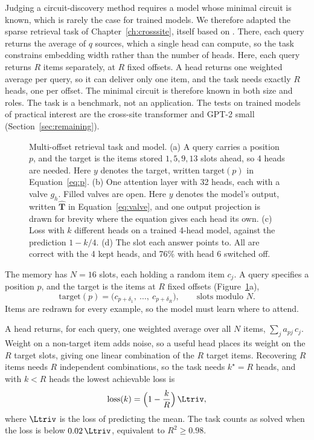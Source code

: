 Judging a circuit-discovery method requires a model whose minimal circuit is known, which is rarely the case for trained models. We therefore adapted the sparse retrieval task of Chapter~\ref{ch:crosssite}, itself based on \citet{sanford2023representational}. There, each query returns the average of $q$ sources, which a single head can compute, so the task constrains embedding width rather than the number of heads. Here, each query returns $R$ items separately, at $R$ fixed offsets. A head returns one weighted average per query, so it can deliver only one item, and the task needs exactly $R$ heads, one per offset. The minimal circuit is therefore known in both size and roles. The task is a benchmark, not an application. The tests on trained models of practical interest are the cross-site transformer and GPT-2 small~\cite{olsson2022,wang2023interpretability} (Section~\ref{sec:remaining}).

\begin{figure}[t]
\centering
{}
\caption[Multi-offset retrieval task and model]{Multi-offset retrieval task and model.
(a) A query carries a position $p$, and the target is the items stored $1, 5, 9, 13$ slots ahead, so 4 heads are needed. Here $y$ denotes the target, written $\text{target}(p)$ in Equation~\eqref{eq:p}.
(b) One attention layer with 32 heads, each with a valve $g_h$. Filled valves are open. Here $y$ denotes the model's output, written $\hat{\bm T}$ in Equation~\eqref{eq:valve}, and one output projection is drawn for brevity where the equation gives each head its own.
(c) Loss with $k$ different heads on a trained 4-head model, against the prediction $1-k/4$.
(d) The slot each answer points to. All are correct with the 4 kept heads, and 76\% with head 6 switched off.}
\label{fig:setup}
\end{figure}

The memory has $N = 16$ slots, each holding a random item $c_j$. A query specifies a position $p$, and the target is the items at $R$ fixed offsets (Figure~\ref{fig:setup}a),
\begin{equation}
  \text{target}(p) = \big(c_{p+\delta_1},\ \dots,\ c_{p+\delta_R}\big),
  \qquad \text{slots modulo } N.
  \label{eq:p}
\end{equation}
Items are redrawn for every example, so the model must learn where to attend.

A head returns, for each query, one weighted average over all $N$ items, $\sum_{j} a_{pj}\, c_j$. Weight on a non-target item adds noise, so a useful head places its weight on the $R$ target slots, giving one linear combination of the $R$ target items. Recovering $R$ items needs $R$ independent combinations, so the task needs $k^\star = R$ heads, and with $k < R$ heads the lowest achievable loss is
\begin{equation}
  \text{loss}(k) = \Big(1 - \frac{k}{R}\Big)\, \Ltriv,
  \label{eq:law}
\end{equation}
where $\Ltriv$ is the loss of predicting the mean. The task counts as solved when the loss is below $0.02\,\Ltriv$, equivalent to $R^2\geq0.98$.

